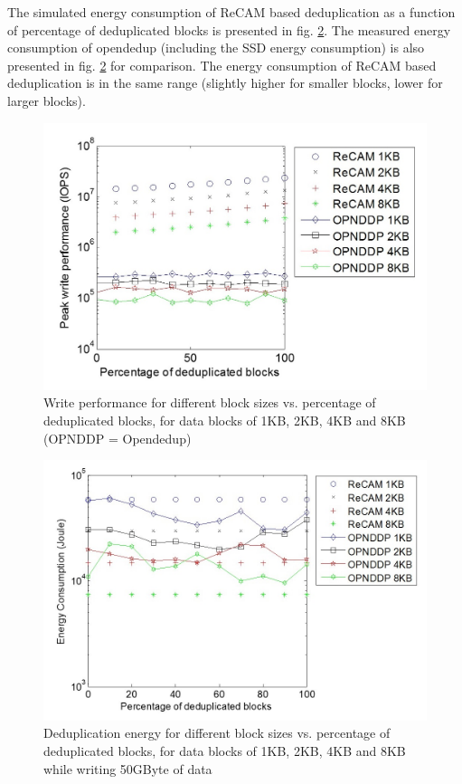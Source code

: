 \documentclass{superfri}
\begin{document}
	The simulated energy consumption of ReCAM based deduplication as a function of percentage of deduplicated blocks is presented in fig. \ref{fig:dedup_energy}. The measured energy consumption of opendedup (including the SSD energy consumption) is also presented in fig. \ref{fig:dedup_energy} for comparison. The energy consumption of ReCAM based deduplication is in the same range (slightly higher for smaller blocks, lower for larger blocks).
	
	\begin{figure}[ht!]
		\centerline{\includegraphics[scale=1]{Figures/dedup_perf.jpg}}
		\caption{Write performance for different block sizes vs. percentage of deduplicated blocks, for data blocks of 1KB, 2KB, 4KB and 8KB (OPNDDP = Opendedup)}
		\label{fig:dedup_performance}
	\end{figure}
	
	\begin{figure}[h!]
		\centerline{\includegraphics[scale=1]{Figures/dedup_energy.jpg}}
		\caption{Deduplication energy for different block sizes vs. percentage of deduplicated blocks, for data blocks of 1KB, 2KB, 4KB and 8KB while writing 50GByte of data}
		\label{fig:dedup_energy}
	\end{figure}
	
\end{document}
